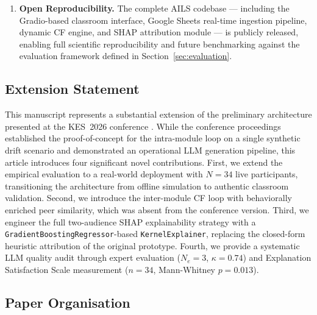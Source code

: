 \documentclass[ASNA,twocolumn]{USG} %
\begin{document}
\begin{enumerate}[1.]
  \item \textbf{Open Reproducibility.}
        The complete AILS codebase --- including the
        Gradio-based classroom interface, Google Sheets
        real-time ingestion pipeline, dynamic CF engine,
        and SHAP attribution module --- is publicly
        released, enabling full scientific reproducibility
        and future benchmarking against the evaluation
        framework defined in Section~\ref{sec:evaluation}.

\end{enumerate}

\subsection{Extension Statement}
\label{sec:intro_extension}

This manuscript represents a substantial extension of the
preliminary architecture presented at the KES~2026
conference \cite{Loussaief2026}.
While the conference proceedings established the
proof-of-concept for the intra-module loop on a single
synthetic drift scenario and demonstrated an operational
LLM generation pipeline, this article introduces four
significant novel contributions.
First, we extend the empirical evaluation to a
real-world deployment with $N{=}34$ live participants,
transitioning the architecture from offline simulation
to authentic classroom validation.
Second, we introduce the inter-module CF loop with
behaviorally enriched peer similarity, which was absent
from the conference version.
Third, we engineer the full two-audience SHAP
explainability strategy with a
\texttt{GradientBoostingRegressor}-based
\texttt{KernelExplainer}, replacing the closed-form
heuristic attribution of the original prototype.
Fourth, we provide a systematic LLM quality audit
through expert evaluation ($N_e{=}3$, $\kappa{=}0.74$)
and Explanation Satisfaction Scale measurement
($n{=}34$, Mann-Whitney $p{=}0.013$).

\subsection{Paper Organisation}
\label{sec:intro_organisation}
\end{document}
